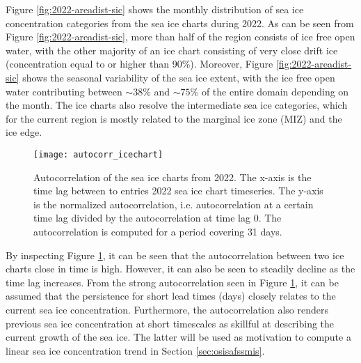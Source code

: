 \documentclass[../main/thesis.tex]{subfiles}
\begin{document}
Figure \ref{fig:2022-areadist-sic} shows the monthly distribution of sea ice concentration categories from the sea ice charts during 2022. As can be seen from Figure \ref{fig:2022-areadist-sic}, more than half of the region consists of ice free open water, with the other majority of an ice chart consisting of very close drift ice (concentration equal to or higher than 90\%). Moreover, Figure \ref{fig:2022-areadist-sic} shows the seasonal variability of the sea ice extent, with the ice free open water contributing between $\sim38$\% and $\sim75$\% of the entire domain depending on the month. The ice charts also resolve the intermediate sea ice categories, which for the current region is mostly related to the marginal ice zone (MIZ) and the ice edge.

\begin{figure}
    \centering
    \texttt{[image: autocorr\_icechart]}
    \caption{\label{fig:autocorr}Autocorrelation of the sea ice charts from 2022. The x-axis is the time lag between to entries 2022 sea ice chart timeseries. The y-axis is the normalized autocorrelation, i.e. autocorrelation at a certain time lag divided by the autocorrelation at time lag 0. The autocorrelation is computed for a period covering 31 days.}
\end{figure}

By inspecting Figure \ref{fig:autocorr}, it can be seen that the autocorrelation between two ice charts close in time is high. However, it can also be seen to steadily decline as the time lag increases. From the strong autocorrelation seen in Figure \ref{fig:autocorr}, it can be assumed that the persistence for short lead times (days) closely relates to the current sea ice concentration. Furthermore, the autocorrelation also renders previous sea ice concentration at short timescales as skillful at describing the current growth of the sea ice. The latter will be used as motivation to compute a linear sea ice concentration trend in Section \ref{sec:osisafssmis}.
\end{document}
